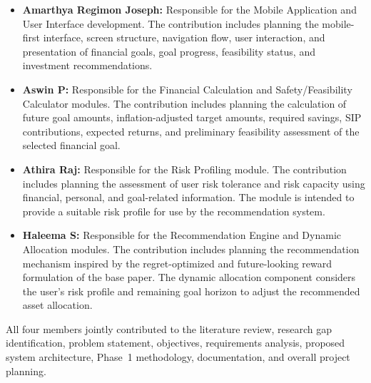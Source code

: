 \begin{itemize}
	\item \textbf{Amarthya Regimon Joseph:} Responsible for the Mobile Application and User Interface development. The contribution includes planning the mobile-first interface, screen structure, navigation flow, user interaction, and presentation of financial goals, goal progress, feasibility status, and investment recommendations.
	\item \textbf{Aswin P:} Responsible for the Financial Calculation and Safety/Feasibility Calculator modules. The contribution includes planning the calculation of future goal amounts, inflation-adjusted target amounts, required savings, SIP contributions, expected returns, and preliminary feasibility assessment of the selected financial goal.
	\item \textbf{Athira Raj:} Responsible for the Risk Profiling module. The contribution includes planning the assessment of user risk tolerance and risk capacity using financial, personal, and goal-related information. The module is intended to provide a suitable risk profile for use by the recommendation system.
	\item \textbf{Haleema S:} Responsible for the Recommendation Engine and Dynamic Allocation modules. The contribution includes planning the recommendation mechanism inspired by the regret-optimized and future-looking reward formulation of the base paper. The dynamic allocation component considers the user's risk profile and remaining goal horizon to adjust the recommended asset allocation.
\end{itemize}
All four members jointly contributed to the literature review, research gap identification, problem statement, objectives, requirements analysis, proposed system architecture, Phase~1 methodology, documentation, and overall project planning.

